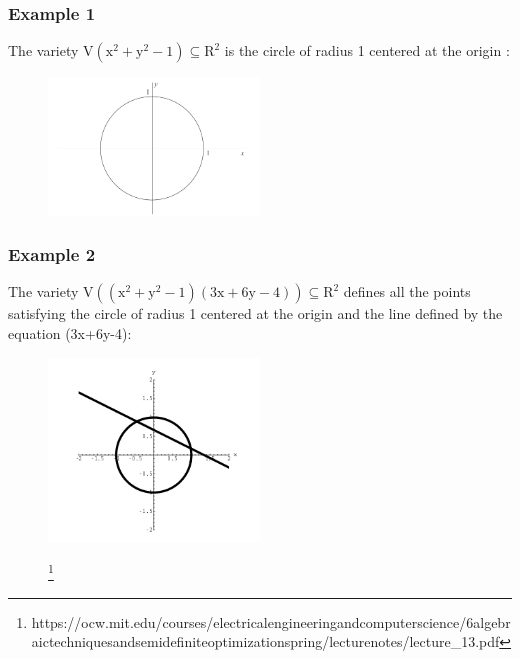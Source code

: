 \documentclass[11pt]{article}
\begin{document}
\subsubsection{Example 1}
The variety $\mathrm{V(x^2+y^2-1) \subseteq R^2}$ is the circle of radius 1 centered at the origin :
\begin{figure}[H]
  \begin{center}
    \includegraphics[width=0.50\textwidth]{circle.png}
    \caption{}
    \label{fig: }
  \end{center}
\end{figure}


 
\subsubsection{Example 2}
The variety $\mathrm{V((x^2+y^2-1)(3x+6y-4)) \subseteq R^2}$ defines all the points satisfying the circle of radius 1 centered at the origin and the line defined by the equation  (3x+6y-4):
\begin{figure}[H]
  \begin{center}
    \includegraphics[width=0.50\textwidth]{circle_and_line.png}
    \caption{}
    \footnote{https://ocw.mit.edu/courses/electrical\-engineering\-and\-computer\-science/6\-algebraic\-techniques\-and\-semidefinite\-optimization\-spring/lecture\-notes/lecture\_13.pdf}
    \label{fig: }
  \end{center}
\end{figure}
\end{document}
